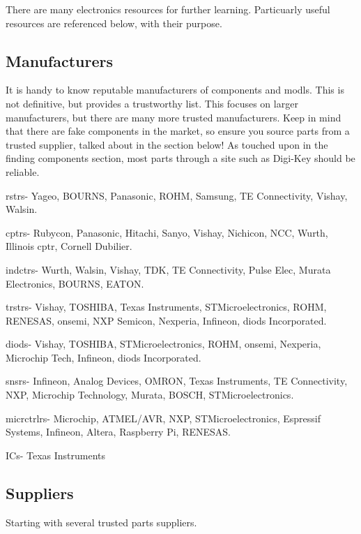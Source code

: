 \documentclass[a4paper,11pt]{report}
\begin{document}
There are many electronics resources for further learning. Particuarly useful resources are referenced below, with their purpose.

\vspace*{1\baselineskip}

\subsection{Manufacturers}

It is handy to know reputable manufacturers of components and \gls{modl}s. This is not definitive, but provides a trustworthy list. This focuses on larger manufacturers, but there are many more trusted manufacturers. Keep in mind that there are fake components in the market, so ensure you source parts from a trusted supplier, talked about in the section below! As touched upon in the finding components section, most parts through a site such as Digi-Key should be reliable.

\gls{rstr}s- Yageo, BOURNS, Panasonic, ROHM, Samsung, TE Connectivity, Vishay, Walsin.

\gls{cptr}s- Rubycon, Panasonic, Hitachi, Sanyo, Vishay, Nichicon, NCC, Wurth, Illinois \gls{cptr}, Cornell Dubilier.

\gls{indctr}s- Wurth, Walsin, Vishay, TDK, TE Connectivity, Pulse Elec, Murata Electronics, BOURNS, EATON.

\gls{trstr}s- Vishay, TOSHIBA, Texas Instruments, STMicroelectronics, ROHM, RENESAS, onsemi, NXP Semicon, Nexperia, Infineon, \gls{diod}s Incorporated.

\gls{diod}s- Vishay, TOSHIBA, STMicroelectronics, ROHM, onsemi, Nexperia, Microchip Tech, Infineon, \gls{diod}s Incorporated.

\gls{snsr}s- Infineon, Analog Devices, OMRON, Texas Instruments, TE Connectivity, NXP, Microchip Technology, Murata, BOSCH, STMicroelectronics.

\gls{micrctrlr}s- Microchip, ATMEL/AVR, NXP, STMicroelectronics, Espressif Systems, Infineon, Altera, Raspberry Pi, RENESAS.

ICs- Texas Instruments

\vspace*{1\baselineskip}

\subsection{Suppliers}

Starting with several trusted parts suppliers.
\end{document}
